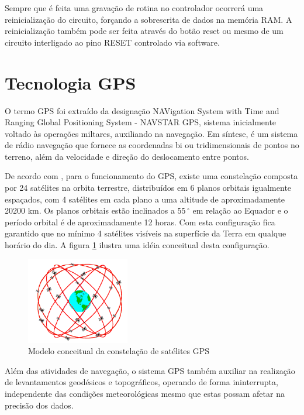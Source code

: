 Sempre que é feita uma gravação de rotina no controlador ocorrerá uma reinicialização do circuito, forçando a sobrescrita de dados na memória RAM. A reinicialização também pode ser feita através do botão reset ou mesmo de um circuito interligado ao pino RESET controlado via software.

\section{Tecnologia GPS}

O termo GPS foi extraído da designação NAVigation System with Time and Ranging Global Positioning System - NAVSTAR GPS, sistema inicialmente voltado às operações miltares, auxiliando na navegação. Em síntese, é um sistema de rádio navegação que fornece as coordenadas bi ou tridimensionais de pontos no terreno, além da velocidade e direção do deslocamento entre pontos.

De acordo com \textcite{gps_iniciantes:2003}, para o funcionamento do GPS, existe uma constelação composta por 24 satélites na orbita terrestre, distribuídos em 6 planos orbitais igualmente espaçados, com 4 satélites em cada plano a uma altitude de aproximadamente 20200 km. Os planos orbitais estão inclinados a $55\,^{\circ}$ em relação ao Equador e o período orbital é de aproximadamente 12 horas. Com esta configuração fica garantido que no mínimo 4 satélites visíveis na superfície da Terra em qualque horário do dia. A figura \ref{fig:conceitogps} ilustra uma idéia conceitual desta configuração.

\begin{figure}[h!]
			\centering
			\includegraphics[width=0.4\textwidth]{figures/constelacaoGPS.png}
			\caption{Modelo conceitual da constela\c{c}\~{a}o de sat\'{e}lites GPS}
			\label{fig:conceitogps}
\end{figure}

Além das atividades de navegação, o sistema GPS também auxiliar na realização de levantamentos geodésicos e topográficos, operando de forma ininterrupta, independente das condições meteorológicas mesmo que estas possam afetar na precisão dos dados.

